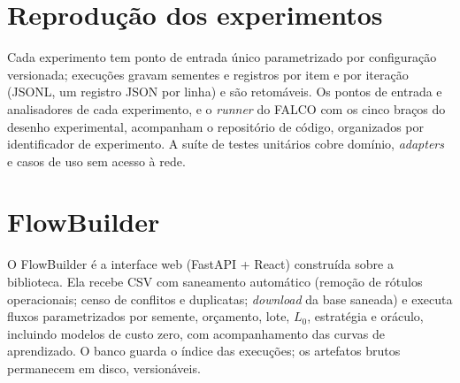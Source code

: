 \section{Reprodução dos experimentos}

Cada experimento tem ponto de entrada único parametrizado por configuração
versionada; execuções gravam sementes e registros por item e por iteração
(JSONL, um registro JSON por linha) e são retomáveis. Os pontos de entrada
e analisadores de cada experimento, e o \textit{runner} do FALCO com os
cinco braços do desenho experimental, acompanham o repositório de código,
organizados por identificador de experimento. A suíte de testes unitários
cobre domínio, \textit{adapters} e casos de uso sem acesso à rede.

\section{FlowBuilder}

O FlowBuilder é a interface web (FastAPI + React) construída sobre a
biblioteca. Ela recebe CSV com saneamento automático (remoção de rótulos
operacionais; censo de conflitos e duplicatas; \textit{download} da base
saneada) e executa fluxos parametrizados por semente, orçamento, lote,
$L_0$, estratégia e oráculo, incluindo modelos de custo zero, com
acompanhamento das curvas de aprendizado. O banco guarda o índice das
execuções; os artefatos brutos permanecem em disco, versionáveis.
